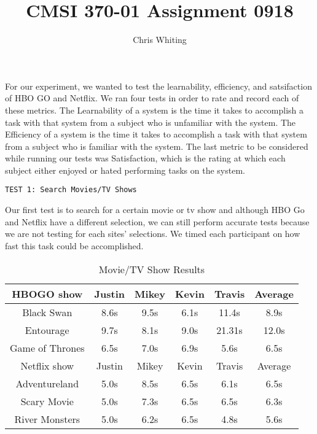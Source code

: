 \documentclass[11pt]{article}
\title{CMSI 370-01 Assignment 0918}
\author{Chris Whiting}
\begin{document}
\maketitle

For our experiment, we wanted to test the learnability, efficiency, and satsifaction of HBO GO and Netflix. We ran four tests in order to rate and record each of these metrics. The Learnability of a system is the time it takes to accomplish a task with that system from a subject who is unfamiliar with the system. The Efficiency of a system is the time it takes to accomplish a task with that system from a subject who is familiar with the system. The last metric to be considered while running our tests was Satisfaction, which is the rating at which each subject either enjoyed or hated performing tasks on the system. 
 
\begin{verbatim}
TEST 1: Search Movies/TV Shows
\end{verbatim}
Our first test is to search for a certain movie or tv show and although HBO Go and Netflix have a different selection, we can still perform accurate tests because we are not testing for each sites' selections. We timed each participant on how fast this task could be accomplished. 

\begin{table}[ht]
\caption{Movie/TV Show Results} %
\centering %
\begin{tabular}{|c|c c c c| c |}  %
\hline\hline %
HBOGO show  &Justin& Mikey&Kevin&Travis&Average  \\ [0.5ex] %
\hline %
Black Swan  & 8.6s & 9.5s&6.1s &11.4s&8.9s    \\ %
Entourage &9.7s&8.1s&9.0s &21.31s&12.0s  \\
Game of Thrones &6.5s&7.0s&6.9s &5.6s&6.5s \\ 
\hline %
Netflix show &Justin& Mikey&Kevin&Travis&Average   \\ [0.5ex]
\hline
Adventureland &5.0s&8.5s&6.5s&6.1s&6.5s   \\
Scary Movie &5.0s&7.3s&6.5s&6.5s& 6.3s    \\
River Monsters &5.0s&6.2s&6.5s&4.8s&5.6s      \\
\hline
\end{tabular}
\label{table:nonlin} %
\end{table}
\end{document}
